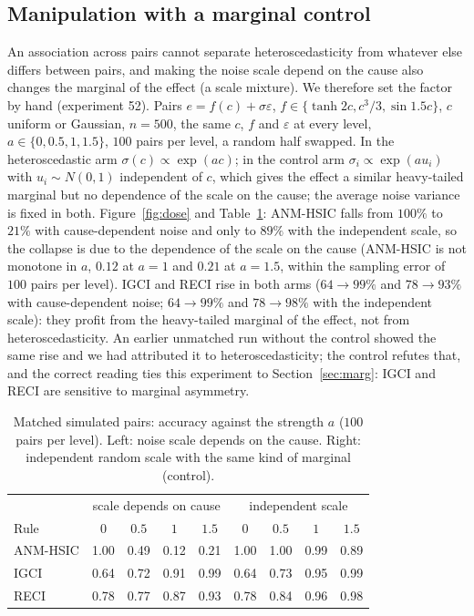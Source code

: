 \subsection{Manipulation with a marginal control}\label{sec:dose}
An association across pairs cannot separate heteroscedasticity from whatever else differs between pairs, and making the noise scale depend on the cause also changes the marginal of the effect (a scale mixture). We therefore set the factor by hand (experiment 52). Pairs $e=f(c)+\sigma\varepsilon$, $f\in\{\tanh 2c,c^3/3,\sin 1.5c\}$, $c$ uniform or Gaussian, $n=500$, the same $c$, $f$ and $\varepsilon$ at every level, $a\in\{0,0.5,1,1.5\}$, $100$ pairs per level, a random half swapped. In the heteroscedastic arm $\sigma(c)\propto\exp(ac)$; in the control arm $\sigma_i\propto\exp(au_i)$ with $u_i\sim N(0,1)$ independent of $c$, which gives the effect a similar heavy-tailed marginal but no dependence of the scale on the cause; the average noise variance is fixed in both. Figure~\ref{fig:dose} and Table~\ref{tab:dose}: ANM-HSIC falls from $100\%$ to $21\%$ with cause-dependent noise and only to $89\%$ with the independent scale, so the collapse is due to the dependence of the scale on the cause (ANM-HSIC is not monotone in $a$, $0.12$ at $a=1$ and $0.21$ at $a=1.5$, within the sampling error of $100$ pairs per level). IGCI and RECI rise in both arms ($64\to99\%$ and $78\to93\%$ with cause-dependent noise; $64\to99\%$ and $78\to98\%$ with the independent scale): they profit from the heavy-tailed marginal of the effect, not from heteroscedasticity. An earlier unmatched run without the control showed the same rise and we had attributed it to heteroscedasticity; the control refutes that, and the correct reading ties this experiment to Section~\ref{sec:marg}: IGCI and RECI are sensitive to marginal asymmetry.

\begin{table}[t]
\caption{Matched simulated pairs: accuracy against the strength $a$ ($100$ pairs per level). Left: noise scale depends on the cause. Right: independent random scale with the same kind of marginal (control).}
\label{tab:dose}
\small
\begin{tabular}{@{}lcccc|cccc@{}}
\toprule
 & \multicolumn{4}{c|}{scale depends on cause} & \multicolumn{4}{c}{independent scale}\\
Rule & $0$ & $0.5$ & $1$ & $1.5$ & $0$ & $0.5$ & $1$ & $1.5$\\
\midrule
ANM-HSIC & 1.00 & 0.49 & 0.12 & 0.21 & 1.00 & 1.00 & 0.99 & 0.89\\
IGCI & 0.64 & 0.72 & 0.91 & 0.99 & 0.64 & 0.73 & 0.95 & 0.99\\
RECI & 0.78 & 0.77 & 0.87 & 0.93 & 0.78 & 0.84 & 0.96 & 0.98\\
\bottomrule
\end{tabular}
\end{table}

